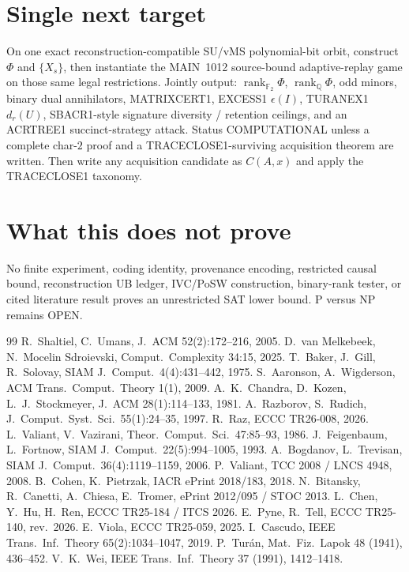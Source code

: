 \documentclass[11pt]{article}
\begin{document}
\section*{Single next target}
On one exact reconstruction-compatible SU/vMS polynomial-bit orbit, construct $\Phi$ and
$\{X_s\}$, then instantiate the MAIN~1012 source-bound adaptive-replay game on those same
legal restrictions. Jointly output:
$\operatorname{rank}_{\mathbb F_2}\Phi$, $\operatorname{rank}_{\mathbb Q}\Phi$, odd minors,
binary dual annihilators, MATRIXCERT1, EXCESS1 $\epsilon(I)$, TURANEX1 $d_r(U)$,
SBACR1-style signature diversity / retention ceilings, and an ACRTREE1 succinct-strategy attack.
Status COMPUTATIONAL unless a complete char-$2$ proof and a TRACECLOSE1-surviving acquisition
theorem are written. Then write any acquisition candidate as $C(A,x)$ and apply the TRACECLOSE1
taxonomy.

\section*{What this does not prove}
No finite experiment, coding identity, provenance encoding, restricted causal bound,
reconstruction UB ledger, IVC/PoSW construction, binary-rank tester, or cited literature result
proves an unrestricted SAT lower bound. P versus NP remains OPEN.

\begin{thebibliography}{99}
 R.~Shaltiel, C.~Umans, J.~ACM 52(2):172--216, 2005.
 D.~van Melkebeek, N.~Mocelin Sdroievski, Comput.\ Complexity 34:15, 2025.
 T.~Baker, J.~Gill, R.~Solovay, SIAM J.\ Comput.\ 4(4):431--442, 1975.
 S.~Aaronson, A.~Wigderson, ACM Trans.\ Comput.\ Theory 1(1), 2009.
 A.~K.~Chandra, D.~Kozen, L.~J.~Stockmeyer, J.~ACM 28(1):114--133, 1981.
 A.~Razborov, S.~Rudich, J.\ Comput.\ Syst.\ Sci.\ 55(1):24--35, 1997.
 R.~Raz, ECCC TR26-008, 2026.
 L.~Valiant, V.~Vazirani, Theor.\ Comput.\ Sci.\ 47:85--93, 1986.
 J.~Feigenbaum, L.~Fortnow, SIAM J.\ Comput.\ 22(5):994--1005, 1993.
 A.~Bogdanov, L.~Trevisan, SIAM J.\ Comput.\ 36(4):1119--1159, 2006.
 P.~Valiant, TCC 2008 / LNCS 4948, 2008.
 B.~Cohen, K.~Pietrzak, IACR ePrint 2018/183, 2018.
 N.~Bitansky, R.~Canetti, A.~Chiesa, E.~Tromer, ePrint 2012/095 / STOC 2013.
 L.~Chen, Y.~Hu, H.~Ren, ECCC TR25-184 / ITCS 2026.
 E.~Pyne, R.~Tell, ECCC TR25-140, rev.\ 2026.
 E.~Viola, ECCC TR25-059, 2025.
 I.~Cascudo, IEEE Trans.\ Inf.\ Theory 65(2):1034--1047, 2019.
 P.~Tur\'an, Mat.\ Fiz.\ Lapok 48 (1941), 436--452.
 V.~K.~Wei, IEEE Trans.\ Inf.\ Theory 37 (1991), 1412--1418.
\end{thebibliography}

\end{document}
